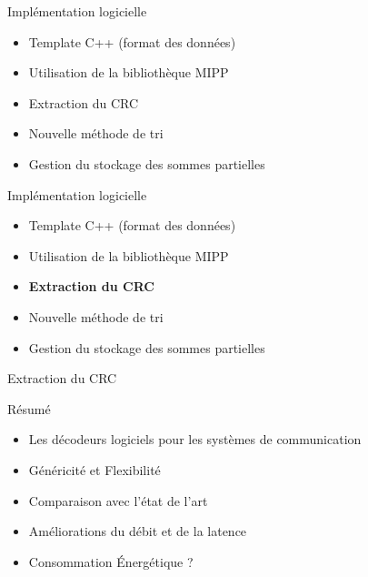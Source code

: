 \begin{frame}[c]{Implémentation logicielle}
	\begin{itemize}
		\vfill
		\item Template C++ (format des données)
		\vfill
		\item Utilisation de la bibliothèque MIPP
		\vfill
		\item Extraction du CRC
		\vfill
		\item Nouvelle méthode de tri
		\vfill
		\item Gestion du stockage des sommes partielles
		\vfill
	\end{itemize}
\end{frame}


\begin{frame}[c]{Implémentation logicielle}
	\begin{itemize}
		\vfill
		\item Template C++ (format des données)
		\vfill
		\item Utilisation de la bibliothèque MIPP
		\vfill
		\item \textbf{Extraction du CRC}
		\vfill
		\item Nouvelle méthode de tri
		\vfill
		\item Gestion du stockage des sommes partielles
		\vfill
	\end{itemize}
\end{frame}


\begin{frame}[c]{Extraction du CRC}
	\centering
\end{frame}

\begin{frame}[c]{Résumé}
	\begin{itemize}
		\vfill
		\item Les décodeurs logiciels pour les systèmes de communication
		\vfill
		\item Généricité et Flexibilité
		\vfill
		\item Comparaison avec l'état de l'art
		\vfill
		\item Améliorations du débit et de la latence
		\vfill
		\item Consommation \'Energétique ?
		\vfill
	\end{itemize}
\end{frame}

